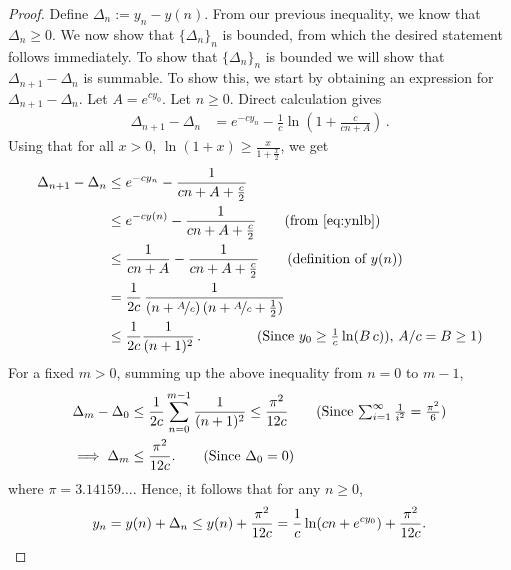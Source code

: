 \begin{proof}
Define $\Delta_n := y_n - y(n)$. From our previous inequality, we know that $\Delta_n \ge 0$. We now show that $\{\Delta_n\}_n$ is bounded, from which the desired statement follows immediately.
To show that $\{\Delta_n\}_n$ is bounded we will show that $\Delta_{n+1}-\Delta_n$ is summable.
To show this, we start by obtaining an expression for $\Delta_{n+1}-\Delta_n$. 
Let $A = e^{c y_0}$. Let $n\ge 0$.
Direct calculation gives
\begin{align*}
    \Delta_{n+1}-\Delta_n 
    & =  e^{-c y_n} - \frac{1}{c} \ln\left( 1 + \frac{c}{cn+A} \right)\,.
\end{align*}
Using that for all $x>0$, $\ln(1+x)\ge \frac{x}{1+\frac{x}{2}}$, we get 
\begin{align*}
    \Delta_{n+1}-\Delta_n 
    & \le e^{-c y_n} - \frac{1}{cn + A + \frac{c}{2}} \\
    & \le e^{-c y(n)} - \frac{1}{cn + A + \frac{c}{2}} \tag{from \cref{eq:ynlb}} \\
    & \le \frac{1}{cn +A } - \frac{1}{cn + A + \frac{c}{2}} \tag{definition of $y(n)$} \\
    & = \frac{1}{2c} \, \frac{1}{(n + \nicefrac{A}{c}) \, (n + \nicefrac{A}{c} + \frac{1}{2})}  \\
    & \le \frac{1}{2c} \frac{1}{(n+1)^2}\,. \qquad \tag{Since $y_0 \geq \frac{1}{c} \ln (B \,c))$, $A/c = B \ge 1$}
\end{align*}
For a fixed $m > 0$, summing up the above inequality from $n = 0$ to $m-1$,
\begin{align*}
\Delta_{m}  - \Delta_{0} & \leq \frac{1}{2c} \sum_{n = 0}^{m-1} \frac{1}{(n+1)^2} \leq \frac{\pi^2}{12c} \tag{Since $\sum_{i = 1}^{\infty} \frac{1}{i^2} = \frac{\pi^2}{6}$} \\
\implies \Delta_{m} & \leq \frac{\pi^2}{12c}.  \tag{Since $\Delta_0 = 0$}
\end{align*}
where $\pi = 3.14159\dots$. Hence, it follows that for any $n\ge 0$,
\begin{equation*}
y_n = y(n) + \Delta_n \leq y(n) + \frac{\pi^2}{12c} = \frac1{c} \ln(c n + e^{c y_0} ) + \frac{\pi^2}{12c}. \qedhere
\end{equation*}
\end{proof}

